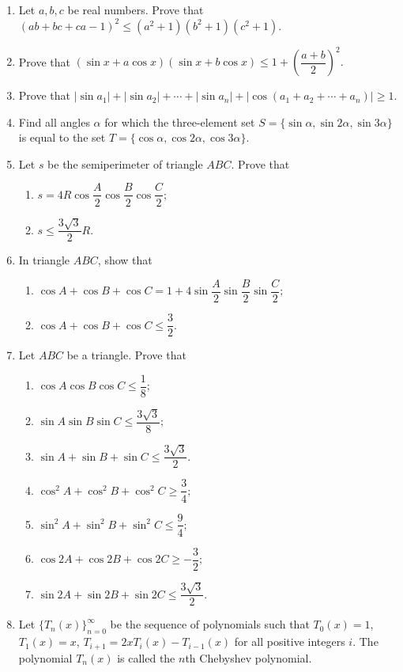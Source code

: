 \documentclass[12pt]{scrartcl}
\begin{document}
\begin{enumerate}
    \item Let $a, b, c$ be real numbers. Prove that $(ab+bc+ca-1)^{2}\le(a^{2}+1)(b^{2}+1)(c^{2}+1)$.
    \item Prove that $(\sin x+a \cos x)(\sin x+b \cos x)\le1+\left(\dfrac{a+b}{2}\right)^{2}.$
    \item Prove that $|\sin a_{1}|+|\sin a_{2}|+\cdots+|\sin a_{n}|+|\cos(a_{1}+a_{2}+\cdots+a_{n})|\ge1.$
    \item Find all angles $\alpha$ for which the three-element set $S=\{\sin \alpha,\sin 2\alpha,\sin 3\alpha\}$ is equal to the set $T=\{\cos \alpha,\cos 2\alpha,\cos 3\alpha\}.$
   
    \item Let $s$ be the semiperimeter of triangle $ABC$. Prove that 
    \begin{enumerate}
        \item $s=4R \cos\dfrac{A}{2}\cos\dfrac{B}{2}\cos\dfrac{C}{2};$ 
        \item $s\le\dfrac{3\sqrt{3}}{2}R.$
    \end{enumerate}
    \item In triangle $ABC$, show that 
    \begin{enumerate}
        \item $\cos A+\cos B+\cos C=1+4 \sin\dfrac{A}{2}\sin\dfrac{B}{2}\sin\dfrac{C}{2};$ 
        \item $\cos A+\cos B+\cos C\le\dfrac{3}{2}.$
    \end{enumerate}
    \item Let $ABC$ be a triangle. Prove that 
    \begin{enumerate}
        \item $\cos A \cos B \cos C\le\dfrac{1}{8};$ 
        \item $\sin A \sin B \sin C\le\dfrac{3\sqrt{3}}{8};$ 
        \item $\sin A+\sin B+\sin C\le\dfrac{3\sqrt{3}}{2}.$ 
        \item $\cos^{2}A+\cos^{2}B+\cos^{2}C\ge\dfrac{3}{4};$ 
        \item $\sin^{2}A+\sin^{2}B+\sin^{2}C\le\dfrac{9}{4};$ 
        \item $\cos 2A+\cos 2B+\cos 2C\ge-\dfrac{3}{2};$ 
        \item $\sin 2A+\sin 2B+\sin 2C\le\dfrac{3\sqrt{3}}{2}.$
    \end{enumerate}
    \item Let $\{T_{n}(x)\}_{n=0}^{\infty}$ be the sequence of polynomials such that $T_{0}(x)=1$, $T_{1}(x)= x$, $T_{i+1}=2xT_{i}(x)-T_{i-1}(x)$ for all positive integers $i$. The polynomial $T_{n}(x)$ is called the $n$th Chebyshev polynomial. 

\end{enumerate}
\end{document}
